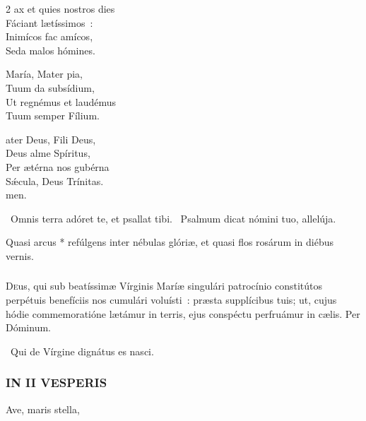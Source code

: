 \documentclass[9pt,twoside]{extarticle}
\begin{document}
\begin{multicols}{2}
\smallskip
\noindent {}ax et quies nostros dies\\
Fáciant lætíssimos~:\\
Inimícos fac amícos,\\
Seda malos hómines.

\smallskip
\noindent {} María, Mater pia,\\
Tuum da subsídium,\\
Ut regnémus et laudémus\\
Tuum semper Fílium.

\smallskip
\noindent {}ater Deus, Fili Deus,\\
Deus alme Spíritus,\\
Per ætérna nos gubérna\\
Sǽcula, Deus Trínitas.\\
{\null \hfill {}men.}

\smallskip
{}~Omnis terra adóret te, et psallat tibi. ~Psalmum dicat nómini tuo, allelúja.

\smallskip
{} Quasi arcus * refúlgens inter nébulas glóriæ, et quasi flos rosárum in diébus vernis.

\subsubsection*{\center {}}
\lettrine{D}{e}us, qui sub beatíssimæ Vírginis Maríæ singulári patrocínio constitútos perpétuis benefíciis nos cumulári voluísti~: præsta supplícibus tuis; ut, cujus hódie commemoratióne lætámur in terris, ejus conspéctu perfruámur in cælis. Per Dóminum.

\smallskip
\small {}


~Qui de Vírgine dignátus es nasci. 

\normalsize

\subsubsection*{\center \normalfont \textsc{IN II VESPERIS}}

\smallskip
\small {} Ave, maris stella, 


\end{multicols}
\end{document}
